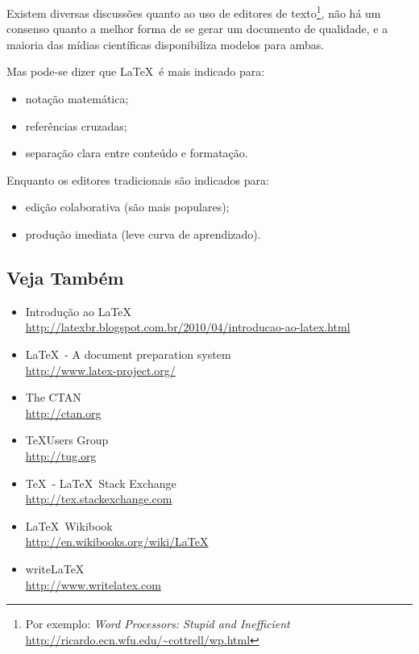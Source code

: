%

Existem diversas discussões quanto ao uso de editores de texto\footnote{Por exemplo:
\emph{Word Processors: Stupid and Inefficient} \url{http://ricardo.ecn.wfu.edu/~cottrell/wp.html}},
não há um consenso quanto a melhor forma de se gerar um documento de qualidade,
e a maioria das mídias científicas disponibiliza modelos para ambas.

Mas pode-se dizer que \LaTeX\ é mais indicado para:
\begin{itemize}
	\item notação matemática;
	\item referências cruzadas;
	\item separação clara entre conteúdo e formatação.
\end{itemize}

Enquanto os editores tradicionais são indicados para:
\begin{itemize}
	\item edição colaborativa (são mais populares);
	\item produção imediata (leve curva de aprendizado).
\end{itemize}

\subsection{Veja Também}
\begin{itemize}
	\item Introdução ao \LaTeX
		\\\url{http://latexbr.blogspot.com.br/2010/04/introducao-ao-latex.html}
	\item \LaTeX\ - A document preparation system
		\\\url{http://www.latex-project.org/}
	\item The \acrlong{CTAN}
		\\\url{http://ctan.org}
	\item \TeX Users Group
		\\\url{http://tug.org}
	\item \TeX\ - \LaTeX\ Stack Exchange
		\\\url{http://tex.stackexchange.com}
	\item \LaTeX\ Wikibook
		\\\url{http://en.wikibooks.org/wiki/LaTeX}
	\item write\LaTeX
		\\\url{http://www.writelatex.com}
\end{itemize}



